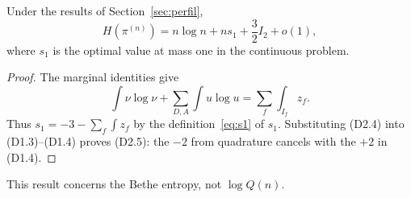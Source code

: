 \begin{teorema}\label{thm:entropia}
Under the results of Section~\ref{sec:perfil},
\[
 H(\pi^{(n)})=n\log n+n s_1+\frac32I_2+o(1),       \tag{D2.5}
\]
where $s_1$ is the optimal value at mass one in the continuous problem.
\end{teorema}
\begin{proof}
The marginal identities give
\[
 \int\nu\log\nu+\sum_{D,A}\int u\log u
        =\sum_f\int_{I_f}z_f.
\]
Thus $s_1=-3-\sum_f\int z_f$ by the definition~\eqref{eq:s1} of $s_1$.
Substituting (D2.4) into (D1.3)--(D1.4) proves (D2.5):
the $-2$ from quadrature cancels with the $+2$ in (D1.4).
\end{proof}
This result concerns the Bethe entropy, not $\log Q(n)$.
